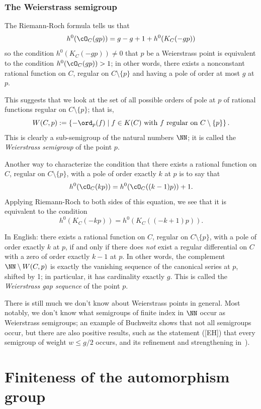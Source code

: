 \subsubsection{The Weierstrass semigroup} 

The Riemann-Roch formula tells us that
$$
h^0(\cO_C(gp)) = g - g + 1 + h^0(K_C(-gp))
$$
so the condition $h^0(K_C(-gp)) \neq 0$ that $p$ be a Weierstrass point is equivalent to the condition $h^0(\cO_C(gp)) > 1$; in other words, there exists a nonconstant rational function on $C$, regular on $C \setminus \{p\}$ and having a pole of order at most $g$ at $p$.

This suggests that we look at the set of all possible orders of pole at $p$ of rational functions regular on $C \setminus \{p\}$; that is,
$$
W(C,p) := \left\{ -\ord_p(f) \mid f \in K(C) \text{ with $f$ regular on } C \setminus \{p\} \right\}.
$$
This is clearly a sub-semigroup of the natural numbers $\NN$; it is called the \emph{Weierstrass semigroup} of the point $p$.  

Another way to characterize the condition that there exists a rational function on $C$, regular on $C \setminus \{p\}$, with a pole of order exactly $k$ at $p$ is to say that
$$
h^0(\cO_C(kp)) = h^0(\cO_C((k-1)p)) + 1.
$$
Applying Riemann-Roch to both sides of this equation, we see that it is equivalent to the condition
$$
h^0(K_C(-kp)) = h^0(K_C((-k+1)p)).
$$

In English: there exists a rational function on $C$, regular on $C \setminus \{p\}$, with a pole of order exactly $k$ at $p$, if and only if there does \emph{not} exist a regular differential on $C$ with a zero of order exactly $k-1$ at $p$.
 In other words, the complement $\NN \setminus W(C,p)$ is exactly the vanishing sequence of the canonical series at $p$, shifted by 1; in particular, it has cardinality  exactly $g$. This is called the \emph{Weierstrass gap sequence} of the point $p$.

There is still much we don't know about Weierstrass points in general. Most notably, we don't know what semigroups of finite index in $\NN$ occur as Weierstrass semigroups; an example of Buchweitz shows that not all semigroups occur, but there are also positive results, such as the statement ([EH]) that every semigroup of weight $w \leq g/2$ occurs, and its refinement and strengthening in~\cite{MR3892968}).


\section{Finiteness of the automorphism group}\label{finiteness section}



